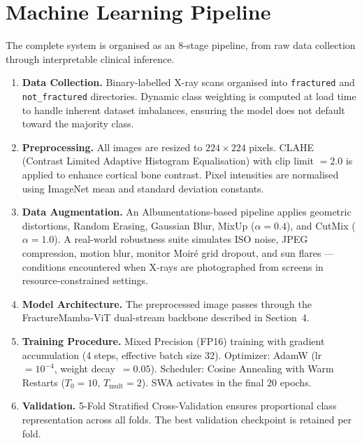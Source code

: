 \documentclass[12pt, a4paper]{article}
\begin{document}
\section{Machine Learning Pipeline}

The complete system is organised as an 8-stage pipeline, from raw data collection through
interpretable clinical inference.

\begin{enumerate}[label=\textbf{Stage \arabic*.}, leftmargin=*, itemsep=6pt]

  \item \textbf{Data Collection.}
  Binary-labelled X-ray scans organised into \texttt{fractured} and \texttt{not\_fractured}
  directories. Dynamic class weighting is computed at load time to handle inherent dataset
  imbalances, ensuring the model does not default toward the majority class.

  \item \textbf{Preprocessing.}
  All images are resized to $224\times224$ pixels. CLAHE (Contrast Limited Adaptive Histogram
  Equalisation) with clip limit $= 2.0$ is applied to enhance cortical bone contrast. Pixel
  intensities are normalised using ImageNet mean and standard deviation constants.

  \item \textbf{Data Augmentation.}
  An Albumentations-based pipeline applies geometric distortions, Random Erasing, Gaussian Blur,
  MixUp ($\alpha=0.4$), and CutMix ($\alpha=1.0$). A real-world robustness suite simulates ISO
  noise, JPEG compression, motion blur, monitor Moir\'{e} grid dropout, and sun flares —
  conditions encountered when X-rays are photographed from screens in resource-constrained settings.

  \item \textbf{Model Architecture.}
  The preprocessed image passes through the FractureMamba-ViT dual-stream backbone described
  in Section~4.

  \item \textbf{Training Procedure.}
  Mixed Precision (FP16) training with gradient accumulation (4 steps, effective batch size 32).
  Optimizer: AdamW (lr~$=10^{-4}$, weight decay~$=0.05$). Scheduler: Cosine Annealing with Warm
  Restarts ($T_0=10$, $T_\text{mult}=2$). SWA activates in the final 20 epochs.

  \item \textbf{Validation.}
  5-Fold Stratified Cross-Validation ensures proportional class representation across all folds.
  The best validation checkpoint is retained per fold.


\end{enumerate}
\end{document}
